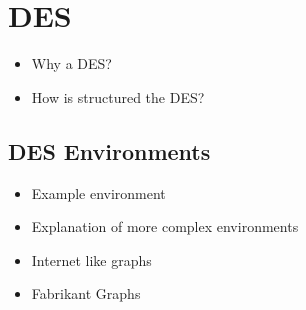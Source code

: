 \chapter{DES}
\label{cha:des}

\begin{itemize}
    \item Why a DES?
    \item How is structured the DES?
\end{itemize}

\section{DES Environments}
\label{sec:des_environment}

\begin{itemize}
    \item Example environment
    \item Explanation of more complex environments
    \item Internet like graphs
    \item Fabrikant Graphs
\end{itemize}

